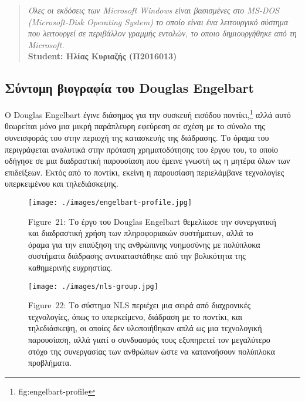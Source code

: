 \documentclass[
]{article}
\begin{document}
\begin{quote}
	\emph{Όλες οι εκδόσεις των Microsoft Windows είναι βασισμένες στο MS-DOS (Microsoft-Disk Operating System) το οποίο είναι ένα λειτουργικό σύστημα που λειτουργεί σε περιβάλλον γραμμής εντολών, το οποιο δημιουργήθηκε από τη Microsoft.}\\
	\textbf{Student: Ηλίας Κυριαζής (Π2016013)}
\end{quote}

\hypertarget{ux3c3ux3cdux3bdux3c4ux3bfux3bcux3b7-ux3b2ux3b9ux3bfux3b3ux3c1ux3b1ux3c6ux3afux3b1-ux3c4ux3bfux3c5-douglas-engelbart}{%
\subsection{Σύντομη βιογραφία του Douglas
Engelbart}\label{ux3c3ux3cdux3bdux3c4ux3bfux3bcux3b7-ux3b2ux3b9ux3bfux3b3ux3c1ux3b1ux3c6ux3afux3b1-ux3c4ux3bfux3c5-douglas-engelbart}}

O Douglas Engelbart έγινε διάσημος για την συσκευή εισόδου
ποντίκι,\footnote{fig:engelbart-profile} αλλά αυτό θεωρείται μόνο μια
μικρή παράπλευρη εφεύρεση σε σχέση με το σύνολο της συνεισφοράς του στην
περιοχή της κατασκευής της διάδρασης. Το όραμα του περιγράφεται
αναλυτικά στην πρόταση χρηματοδότησης του έργου του, το οποίο οδήγησε σε
μια διαδραστική παρουσίαση που έμεινε γνωστή ως η μητέρα όλων των
επιδείξεων. Εκτός από το ποντίκι, εκείνη η παρουσίαση περιελάμβανε
τεχνολογίες υπερκειμένου και τηλεδιάσκεψης.

\leavevmode{}%
\begin{figure}
\hypertarget{fig:engelbart-profile}{%
\centering
\texttt{[image: ./images/engelbart-profile.jpg]}
\caption{Figure~21: Το έργο του Douglas Engelbart θεμελίωσε την
συνεργατική και διαδραστική χρήση των πληροφοριακών συστήματων, αλλά το
όραμα για την επαύξηση της ανθρώπινης νοημοσύνης με πολύπλοκα συστήματα
διάδρασης αντικαταστάθηκε από την βολικότητα της καθημερινής
ευχρηστίας.}\label{fig:engelbart-profile}
}
\end{figure}

\leavevmode{}%
\begin{figure}
\hypertarget{fig:nls-group}{%
\centering
\texttt{[image: ./images/nls-group.jpg]}
\caption{Figure~22: Το σύστημα NLS περιέχει μια σειρά από διαχρονικές
τεχνολογίες, όπως το υπερκείμενο, διάδραση με το ποντίκι, και
τηλεδιάσκεψη, οι οποίες δεν υλοποιήθηκαν απλά ως μια τεχνολογική
παρουσίαση, αλλά γιατί ο συνδυασμός τους εξυπηρετεί τον μεγαλύτερο στόχο
της συνεργασίας των ανθρώπων ώστε να κατανοήσουν πολύπλοκα
προβλήματα.}\label{fig:nls-group}
}
\end{figure}
\end{document}
